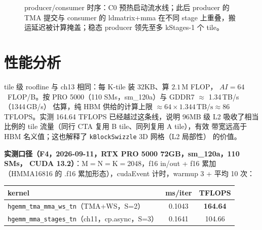 \begin{figure}[htbp]
\caption{producer/consumer 时序：C0 预热启动流水线；此后 producer 的 TMA 提交与 consumer 的 ldmatrix+mma 在不同 stage 上重叠，搬运延迟被计算掩盖；稳态 producer 领先至多 kStages-1 个 tile。}
\label{fig:14-2}
\end{figure}

\section{性能分析}

tile 级 roofline 与 ch13 相同：每 K-tile 装 32KB、算 $2.1\,\mathrm{M}$ FLOP，
$AI = 64$~FLOP/B。按 PRO 5000（110 SMs，sm\_120a）与 GDDR7 $\approx$ 1.34\,TB/s（1344\,GB/s）
估算，纯 HBM 供给的计算上限 $\approx 64 \times 1.344\,\mathrm{TB/s} \approx
86$ TFLOPS。实测 164.64 TFLOPS 已经越过这条线，说明 96MB 级 L2
吸收了相当比例的 tile 流量（同行 CTA 复用 B tile、同列复用 A tile），有效
带宽远高于 HBM 名义值；这也解释了 \texttt{k\allowbreak{}Block\allowbreak{}Swizzle} 3D 网格（L2 局部性）
的价值。

\textbf{实测口径（F4，2026-09-11，RTX PRO 5000 72GB，sm\_120a，110 SMs，
CUDA 13.2）}：M$=$N$=$K$=$2048，f16 in/out + f16 累加（HMMA16816 的 .f16
累加形态），cudaEvent 计时，warmup 3 + 平均 10 次：

\begin{center}
\begin{tabular}{lcc}
\toprule
kernel & ms/iter & TFLOPS \\
\midrule
\texttt{hgemm\_\allowbreak{}tma\_\allowbreak{}mma\_\allowbreak{}ws\_\allowbreak{}tn}（TMA+WS，S=2） & 0.1043 & \textbf{164.64} \\
\texttt{hgemm\_\allowbreak{}mma\_\allowbreak{}stages\_\allowbreak{}tn}（ch11，cp.async，S=3） & 0.1641 & 104.66 \\
\bottomrule
\end{tabular}
\end{center}

